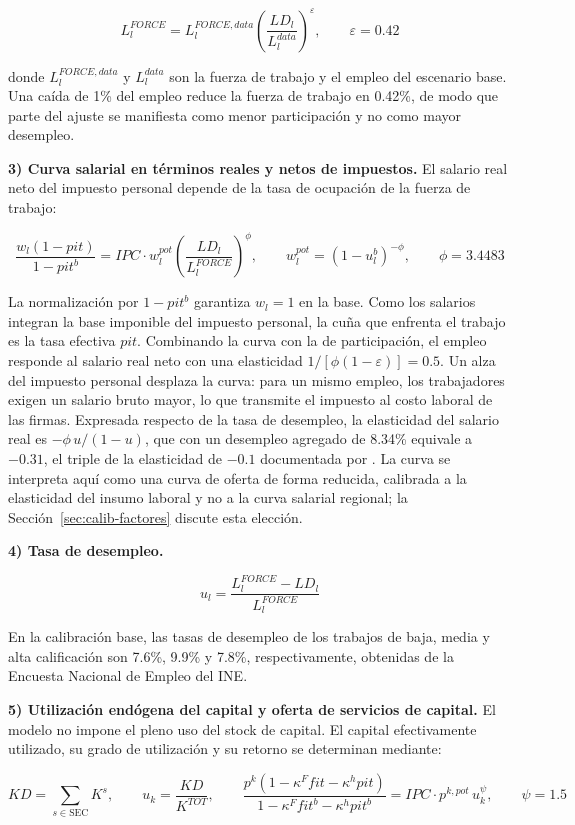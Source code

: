 \documentclass[11pt]{article}
\begin{document}
\[
L^{FORCE}_{l}=L^{FORCE,data}_{l}\left(\frac{LD_{l}}{L^{data}_{l}}\right)^{\varepsilon},\qquad \varepsilon=0.42
\]

donde $L^{FORCE,data}_{l}$ y $L^{data}_{l}$ son la fuerza de trabajo y el empleo del escenario base. Una caída de 1\% del empleo reduce la fuerza de trabajo en 0.42\%, de modo que parte del ajuste se manifiesta como menor participación y no como mayor desempleo.

\textbf{3) Curva salarial en términos reales y netos de impuestos.} El salario real neto del impuesto personal depende de la tasa de ocupación de la fuerza de trabajo:

\[
\frac{w_{l}\left(1-pit\right)}{1-pit^{b}}=IPC\cdot w^{pot}_{l}\left(\frac{LD_{l}}{L^{FORCE}_{l}}\right)^{\phi}, \qquad w^{pot}_{l}=\left(1-u^{b}_{l}\right)^{-\phi},\qquad \phi=3.4483
\]

La normalización por $1-pit^{b}$ garantiza $w_{l}=1$ en la base. Como los salarios integran la base imponible del impuesto personal, la cuña que enfrenta el trabajo es la tasa efectiva $pit$. Combinando la curva con la de participación, el empleo responde al salario real neto con una elasticidad $1/[\phi(1-\varepsilon)]=0.5$. Un alza del impuesto personal desplaza la curva: para un mismo empleo, los trabajadores exigen un salario bruto mayor, lo que transmite el impuesto al costo laboral de las firmas. Expresada respecto de la tasa de desempleo, la elasticidad del salario real es $-\phi\,u/(1-u)$, que con un desempleo agregado de 8.34\% equivale a $-0.31$, el triple de la elasticidad de $-0.1$ documentada por \cite{blanchflower_oswald_1994}. La curva se interpreta aquí como una curva de oferta de forma reducida, calibrada a la elasticidad del insumo laboral y no a la curva salarial regional; la Sección~\ref{sec:calib-factores} discute esta elección.

\textbf{4) Tasa de desempleo.}

\[
u_{l}=\frac{L^{FORCE}_{l}-LD_{l}}{L^{FORCE}_{l}}
\]

En la calibración base, las tasas de desempleo de los trabajos de baja, media y alta calificación son 7.6\%, 9.9\% y 7.8\%, respectivamente, obtenidas de la Encuesta Nacional de Empleo del INE.

\textbf{5) Utilización endógena del capital y oferta de servicios de capital.} El modelo no impone el pleno uso del stock de capital. El capital efectivamente utilizado, su grado de utilización y su retorno se determinan mediante:

\[
KD=\sum_{s\in \mathrm{SEC}}K^{s}, \qquad
u_{k}=\frac{KD}{K^{TOT}}, \qquad
\frac{p^{k}\left(1-\kappa^{F}fit-\kappa^{h}pit\right)}{1-\kappa^{F}fit^{b}-\kappa^{h}pit^{b}}=IPC\cdot p^{k,pot}\,u_{k}^{\psi},\qquad \psi=1.5
\]
\end{document}
